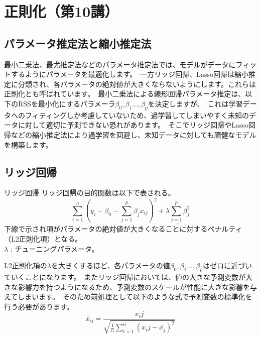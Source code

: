 \documentclass[uplatex]{jsarticle}
\begin{document}
\section{正則化（第10講）}
\subsection{パラメータ推定法と縮小推定法}
最小二乗法、最尤推定法などのパラメータ推定法では、モデルがデータにフィットするようにパラメータを最適化します。\
一方リッジ回帰、Lasso回帰は縮小推定に分類され、各パラメータの絶対値が大きくならないようにします。これらは正則化とも呼ばれています。\
最小二乗法による線形回帰パラメータ推定は、以下の{\rm RSS}を最小化にするパラメーラ$\beta_0, \beta_1..., \beta_p$を決定しますが、\
これは学習データへのフィティングしか考慮していないため、過学習してしまいやすく未知のデータに対して適切に予測できない恐れがあります。\
そこでリッジ回帰やLasso回帰などの縮小推定法により過学習を回避し、未知データに対しても頑健なモデルを構築します。

\subsection{リッジ回帰}
\begin{itembox}[l]{リッジ回帰}
  リッジ回帰の目的関数は以下で表される。
  $$\sum_{i=1}^n \left(y_i - \beta_0 - \sum_{j=1}^p \beta_jx_{ij}\right)^2 + \underline{\lambda \sum_{j=1}^p \beta_j^2}$$
下線で示され項がパラメータの絶対値が大きくなることに対するペナルティ（L2正則化項）となる。\\
$\lambda$ : チューニングパラメータ。
\end{itembox}
L2正則化項の$\lambda$を大きくするほど、各パラメータの値$\beta_0, \beta_1..., \beta_p$はゼロに近づいていくことになります。\
またリッジ回帰においては、値の大きな予測変数が大きな影響力を持つようになるため、予測変数のスケールが性能に大きな影響を与えてしまいます。\
そのため前処理として以下のような式で予測変数の標準化を行う必要があります。
  $$\widetilde{x_{ij}} = \frac{x_ij}{\sqrt{\frac{1}{n} \sum_{i=1}^n (x_ij - \overline{x_j})^2}}$$
\end{document}
